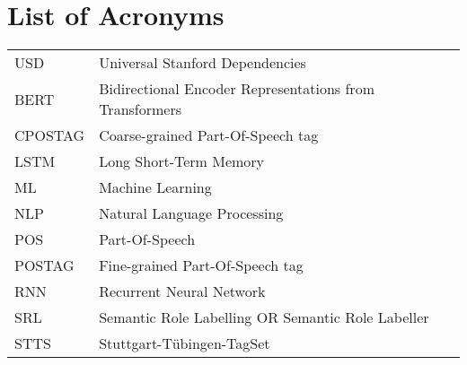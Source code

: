 {}
\chapter*{List of Acronyms}

\begin{supertabular}{lp{12.5cm}}
USD & Universal Stanford Dependencies\\
BERT & Bidirectional Encoder Representations from Transformers\\
CPOSTAG &  Coarse-grained Part-Of-Speech tag\\
LSTM & Long Short-Term Memory\\
ML & Machine Learning\\
NLP & Natural Language Processing\\
POS & Part-Of-Speech\\
POSTAG & Fine-grained Part-Of-Speech tag\\
RNN & Recurrent Neural Network\\
SRL & Semantic Role Labelling OR Semantic Role Labeller\\
STTS & Stuttgart-Tübingen-TagSet\\
\end{supertabular}

\newpage
